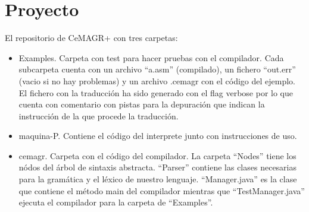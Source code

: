 \documentclass[spanish, a4paper, 12pt] {article}
\newcommand{\lname}[0]{CeMAGR+ }
\begin{document}
\section*{Proyecto}
El repositorio de \lname con tres carpetas:
\begin{itemize}
    \item Examples. Carpeta con test para hacer pruebas con el compilador. Cada subcarpeta cuenta con un archivo ``a.asm'' (compilado), un fichero ``out.err'' (vacio si no hay problemas) y un archivo .cemagr con el código del ejemplo. El fichero con la traducción ha sido generado con el flag verbose por lo que cuenta con comentario con pistas para la depuración que indican la instrucción de la que procede la traducción.
    \item maquina-P. Contiene el código del interprete junto con instrucciones de uso.
    \item cemagr. Carpeta con el código del compilador. La carpeta ``Nodes'' tiene los nódos del árbol de sintaxis abstracta. ``Parser'' contiene las clases necesarias para la gramática y el léxico de nuestro lenguaje. ``Manager.java'' es la clase que contiene el método main del compilador mientras que ``TestManager.java'' ejecuta el compilador para la carpeta de ``Examples''.
\end{itemize}
\end{document}
